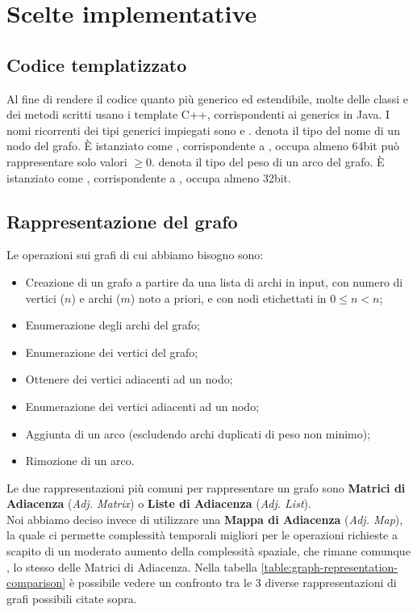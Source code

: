 \section{Scelte implementative}
\label{cap:implementation-choices}

\subsection{Codice templatizzato}

Al fine di rendere il codice quanto più generico ed estendibile, molte delle classi e dei metodi scritti
usano i template C++, corrispondenti ai generics in Java.
I nomi ricorrenti dei tipi generici impiegati sono  e .
 denota il tipo del nome di un nodo del grafo. È istanziato come , corrispondente a , occupa almeno 64bit può rappresentare solo valori $\geq 0$.
 denota il tipo del peso di un arco del grafo. È istanziato come , corrispondente a ,
occupa almeno 32bit.

\subsection{Rappresentazione del grafo}
\label{sub:graph-representation}

Le operazioni sui grafi di cui abbiamo bisogno sono:

\begin{itemize}
    \item Creazione di un grafo a partire da una lista di archi in input, con numero di vertici ($n$) e archi ($m$) noto a priori, e con nodi etichettati in $ 0 \leq n < n $;
    \item Enumerazione degli archi del grafo;
    \item Enumerazione dei vertici del grafo;
    \item Ottenere dei vertici adiacenti ad un nodo;
    \item Enumerazione dei vertici adiacenti ad un nodo;
    \item Aggiunta di un arco (escludendo archi duplicati di peso non minimo);
    \item Rimozione di un arco.
\end{itemize}

\noindent Le due rappresentazioni più comuni per rappresentare un grafo sono \textbf{Matrici di Adiacenza} (\textit{Adj. Matrix}) o \textbf{Liste di Adiacenza} (\textit{Adj. List}). \\
Noi abbiamo deciso invece di utilizzare una \textbf{Mappa di Adiacenza} (\textit{Adj. Map}), la quale ci permette complessità temporali migliori per le operazioni richieste a scapito di un moderato aumento della complessità spaziale, che rimane comunque \complexityNPlusM{}, lo stesso delle Matrici di Adiacenza. Nella tabella \ref{table:graph-representation-comparison} è possibile vedere un confronto tra le 3 diverse rappresentazioni di grafi possibili citate sopra. \\

